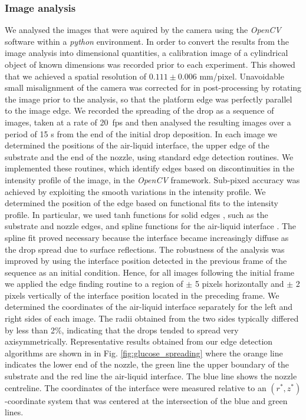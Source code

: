 \documentclass[aip,graphicx]{revtex4-1}
\begin{document}
\subsubsection{Image analysis\label{image}}
We analysed the images that were aquired by the camera using the \textit{OpenCV}
software \cite{bradski2008learning} within a \textit{python} environment.  In
order to convert the results from the image analysis into dimensional
quantities, a calibration image of a cylindrical object of known
dimensions was recorded prior to each experiment. This showed
that we achieved a spatial resolution of $0.111 \pm 0.006$
mm/pixel. Unavoidable small misalignment of the camera was corrected for in
post-processing by rotating the image prior to the analysis, so that
the platform edge was perfectly parallel to the image edge.
We recorded the spreading of the drop as a sequence of images, taken at a
rate of 20~fps and then analysed the resulting images over a period of 
15 s from the end of the initial drop deposition. In each image we determined 
the positions of the air-liquid interface, the upper edge of the
substrate and the end of the nozzle, using standard edge detection
routines.
We implemented these routines, which identify edges based on discontinuities in the
intensity profile of the image, in the \textit{OpenCV} framework.
Sub-pixed accuracy was achieved by exploiting the smooth variations 
in the intensity profile. 
We determined the position of the edge based on functional fits to the
intensity profile. In particular, we used tanh functions for solid
edges \cite{nalwa1986detecting}, such as the substrate and nozzle edges, and spline functions for
the air-liquid interface
\cite{poggio1985computational,poggio1988regularized}. The spline fit
proved necessary because the interface became increasingly diffuse as the
drop spread due to surface reflections. The robustness of
the analysis was improved by using the interface position detected in the
previous frame of the sequence as an initial condition. Hence, for all
images following the initial frame we applied the edge finding routine
to a region of $\pm$ 5 pixels horizontally and $\pm$ 2 pixels
vertically of the interface position located in the preceding
frame. We determined the coordinates of the air-liquid interface separately
for the left and right sides of each image. The radii obtained from
the two sides typically differed by less than 2\%, indicating that
the drops tended to spread very axisymmetrically. Representative
results obtained from our edge detection algorithms are shown in in Fig. 
\ref{fig:glucose_spreading} where the orange line indicates the lower
end of the nozzle, the green line the upper boundary of the 
substrate and the red line the air-liquid interface. The blue line
shows the nozzle centreline. The coordinates of the interface were 
measured relative to an $(r^*,z^*)$-coordinate system that was centered at
the intersection of the blue and green lines.
\end{document}
